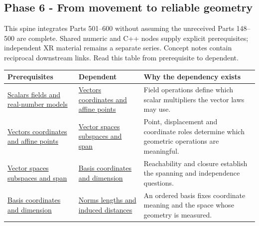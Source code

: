 \subsection{Phase 6 - From movement to reliable geometry}\label{appendix-4ad47bdd269a-phase-6---from-movement-to-reliable-geometry}

\hypertarget{appendix-4ad47bdd269a-phase-6---from-movement-to-reliable-geometry}{}

This spine integrates Parts 501--600 without assuming the unreceived Parts 148--500 are complete. Shared numeric and C++ nodes supply explicit prerequisites; independent XR material remains a separate series. Concept notes contain reciprocal downstream links. Read this table from prerequisite to dependent.

{\def\LTcaptype{none} %
\begin{longtable}[]{@{}
  >{\raggedright\arraybackslash}p{}
  >{\raggedright\arraybackslash}p{}
  >{\raggedright\arraybackslash}p{}@{}}
\toprule\noalign{}
\begin{minipage}[b]{\linewidth}\raggedright
Prerequisites
\end{minipage} & \begin{minipage}[b]{\linewidth}\raggedright
Dependent
\end{minipage} & \begin{minipage}[b]{\linewidth}\raggedright
Why the dependency exists
\end{minipage} \\
\midrule\noalign{}
\endhead
\bottomrule\noalign{}
\endlastfoot
\hyperref[appendix-52051ad550fe]{Scalars fields and real-number models} & \hyperref[appendix-0659864c0aa3]{Vectors coordinates and affine points} & Field operations define which scalar multipliers the vector laws may use. \\
\hyperref[appendix-0659864c0aa3]{Vectors coordinates and affine points} & \hyperref[appendix-173b52c063ae]{Vector spaces subspaces and span} & Point, displacement and coordinate roles determine which geometric operations are meaningful. \\
\hyperref[appendix-173b52c063ae]{Vector spaces subspaces and span} & \hyperref[appendix-ce0341f7ea0d]{Basis coordinates and dimension} & Reachability and closure establish the spanning and independence questions. \\
\hyperref[appendix-ce0341f7ea0d]{Basis coordinates and dimension} & \hyperref[appendix-49933872bb51]{Norms lengths and induced distances} & An ordered basis fixes coordinate meaning and the space whose geometry is measured. \\

\end{longtable}}
